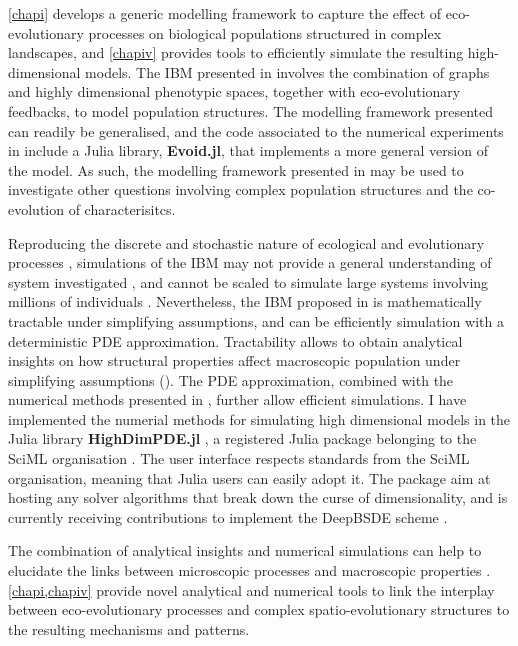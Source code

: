 \cref{chapi} develops a generic modelling framework to capture the effect of eco-evolutionary processes on biological populations structured in complex landscapes, and \cref{chapiv} provides tools to efficiently simulate the resulting high-dimensional models.
% 
The IBM presented in \chapi involves the combination of graphs and highly dimensional phenotypic spaces, together with eco-evolutionary feedbacks, to model population structures. The modelling framework presented can readily be generalised, and the code associated to the numerical experiments in \chapi include a Julia library, \textbf{Evoid.jl}, that implements a more general version of the model. %
% 
As such, the modelling framework presented in \chapi may be used to investigate other questions involving complex population structures and the co-evolution of characterisitcs.

% 
Reproducing the discrete and stochastic nature of ecological and evolutionary processes \cite{Champagnat2006}, simulations of the IBM may not provide a general understanding of system investigated \xxx, and cannot be scaled to simulate large systems involving millions of individuals \xxx. Nevertheless, the IBM proposed in \chapi is mathematically tractable under simplifying assumptions, and can be efficiently simulation with a deterministic PDE approximation.
% 
Tractability allows to obtain analytical insights on how structural properties affect macroscopic population under simplifying assumptions (\chapi).
% 
The PDE approximation, combined with the numerical methods presented in \chapiv, further allow efficient simulations. 
% 
I have implemented the numerial methods for simulating high dimensional models in the Julia library \textbf{HighDimPDE.jl} \cite{HighDimPDE}, a registered Julia package belonging to the SciML organisation \cite{XXX}.
The user interface respects standards from the SciML organisation, meaning that Julia users can easily adopt it.
%
The package aim at hosting any solver algorithms that break down the curse of dimensionality, and is currently receiving contributions to implement the DeepBSDE scheme \cite{Han2018}.

The combination of analytical insights and numerical simulations can help to elucidate the links between microscopic processes and macroscopic properties \cite{Levin}.
% 
\cref{chapi,chapiv} provide novel analytical and numerical tools to link the interplay between eco-evolutionary processes and complex spatio-evolutionary structures to the resulting mechanisms and patterns.



